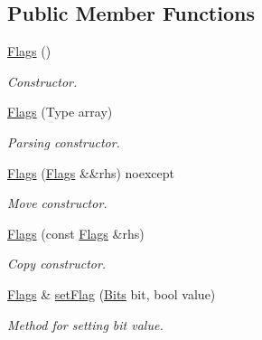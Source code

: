 \subsection*{Public Member Functions}
\begin{DoxyCompactItemize}
\item 
\mbox{\label{classDiameter_1_1AVP_1_1Header_1_1Flags_a727e454894ee69b06da8cf847e8c4339}} 
\hyperlink{classDiameter_1_1AVP_1_1Header_1_1Flags_a727e454894ee69b06da8cf847e8c4339}{Flags} ()
\begin{DoxyCompactList}\small\item\em Constructor. \end{DoxyCompactList}\item 
\hyperlink{classDiameter_1_1AVP_1_1Header_1_1Flags_aafe29286cfb1709d9bc5b23106e62d70}{Flags} (Type array)
\begin{DoxyCompactList}\small\item\em Parsing constructor. \end{DoxyCompactList}\item 
\mbox{\label{classDiameter_1_1AVP_1_1Header_1_1Flags_a111c335add6a1914d32b934c3a9a030f}} 
\hyperlink{classDiameter_1_1AVP_1_1Header_1_1Flags_a111c335add6a1914d32b934c3a9a030f}{Flags} (\hyperlink{classDiameter_1_1AVP_1_1Header_1_1Flags}{Flags} \&\&rhs) noexcept
\begin{DoxyCompactList}\small\item\em Move constructor. \end{DoxyCompactList}\item 
\hyperlink{classDiameter_1_1AVP_1_1Header_1_1Flags_a501b8e6b0e513f98614a4defde2b9e06}{Flags} (const \hyperlink{classDiameter_1_1AVP_1_1Header_1_1Flags}{Flags} \&rhs)
\begin{DoxyCompactList}\small\item\em Copy constructor. \end{DoxyCompactList}\item 
\hyperlink{classDiameter_1_1AVP_1_1Header_1_1Flags}{Flags} \& \hyperlink{classDiameter_1_1AVP_1_1Header_1_1Flags_a4ba216d20eac1f0cab1573b6b354d33c}{set\+Flag} (\hyperlink{classDiameter_1_1AVP_1_1Header_1_1Flags_af24fa00d6135e01a5b58c9ae84245262}{Bits} bit, bool value)
\begin{DoxyCompactList}\small\item\em Method for setting bit value. \end{DoxyCompactList}\item 

\end{DoxyCompactItemize}
